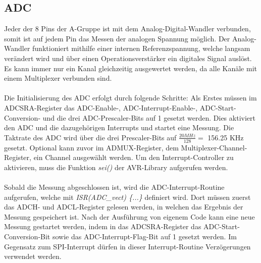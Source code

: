 \documentclass[12pt]{article}
\begin{document}
\subsection{ADC}
Jeder der 8 Pins der A-Gruppe ist mit dem Analog-Digital-Wandler verbunden, somit ist auf jedem Pin das Messen der analogen Spannung möglich. Der Analog-Wandler funktioniert mithilfe einer internen Referenzspannung, welche langsam verändert wird und über einen Operationsverstärker ein digitales Signal auslöst. Es kann immer nur ein Kanal gleichzeitig ausgewertet werden, da alle Kanäle mit einem Multiplexer verbunden sind. 
\\\\Die Initialisierung des ADC erfolgt durch folgende Schritte: Als Erstes müssen im ADCSRA-Register das ADC-Enable-, ADC-Interrupt-Enable-, ADC-Start-Conversion- und die drei ADC-Prescaler-Bits auf 1 gesetzt werden. Dies aktiviert den ADC und die dazugehörigen Interrupts und startet eine Messung. Die Taktrate des ADC wird über die drei Prescaler-Bits auf  $\frac{20MHz}{128} = $ 156.25 KHz gesetzt. Optional kann zuvor im ADMUX-Register, dem Multiplexer-Channel-Register, ein Channel ausgewählt werden. Um den Interrupt-Controller zu aktivieren, muss die Funktion \textit{sei()} der AVR-Library aufgerufen werden.
\\\\Sobald die Messung abgeschlossen ist, wird die ADC-Interrupt-Routine aufgerufen, welche mit \textit{ISR(ADC\_vect) \{...\}} definiert wird. Dort müssen zuerst das ADCH- und ADCL-Register gelesen werden, in welchen das Ergebnis der Messung gespeichert ist. Nach der Ausführung von eigenem Code kann eine neue Messung gestartet werden, indem in das ADCSRA-Register das ADC-Start-Conversion-Bit sowie das ADC-Interrupt-Flag-Bit auf 1 gesetzt werden. Im Gegensatz zum SPI-Interrupt dürfen in dieser Interrupt-Routine Verzögerungen verwendet werden.
\end{document}
